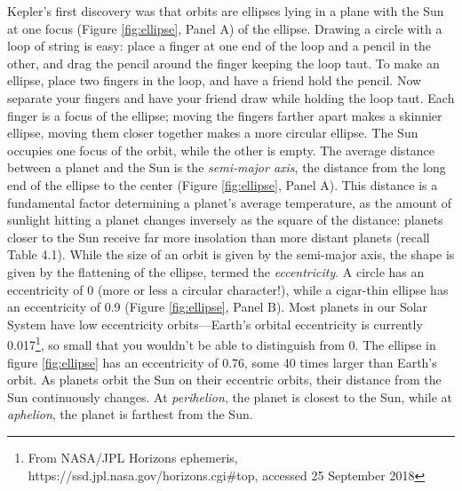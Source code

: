 Kepler's first discovery was that orbits are ellipses lying in a plane with the Sun at one focus (Figure \ref{fig:ellipse}, Panel A) of the ellipse. Drawing a circle with a loop of string is easy: place a finger at one end of the loop and a pencil in the other, and drag the pencil around the finger keeping the loop taut. To make an ellipse, place two fingers in the loop, and have a friend hold the pencil. Now separate your fingers and have your friend draw while holding the loop taut. Each finger is a focus of the ellipse; moving the fingers farther apart makes a skinnier ellipse, moving them closer together makes a more circular ellipse. The Sun occupies one focus of the orbit, while the other is empty. The average distance between a planet and the Sun is the \emph{semi-major axis}, the distance from the long end of the ellipse to the center (Figure \ref{fig:ellipse}, Panel A). This distance is a fundamental factor determining a planet's average temperature, as the amount of sunlight hitting a planet changes inversely as the square of the distance: planets closer to the Sun receive far more insolation than more distant planets (recall Table 4.1). While the size of an orbit is given by the semi-major axis, the shape is given by the flattening of the ellipse, termed the \emph{eccentricity}. A circle has an eccentricity of 0 (more or less a circular character!), while a cigar-thin ellipse has an eccentricity of 0.9 (Figure \ref{fig:ellipse}, Panel B). Most planets in our Solar System have low eccentricity orbits---Earth's orbital eccentricity is currently 0.017\footnote{From NASA/JPL Horizons ephemeris, https://ssd.jpl.nasa.gov/horizons.cgi\#top, accessed 25 September 2018}, so small that you wouldn't be able to distinguish from 0. The ellipse in figure \ref{fig:ellipse} has an eccentricity of 0.76, some 40 times larger than Earth's orbit. As planets orbit the Sun on their eccentric orbits, their distance from the Sun continuously changes. At \emph{perihelion}, the planet is closest to the Sun, while at \emph{aphelion}, the planet is farthest from the Sun. \\

